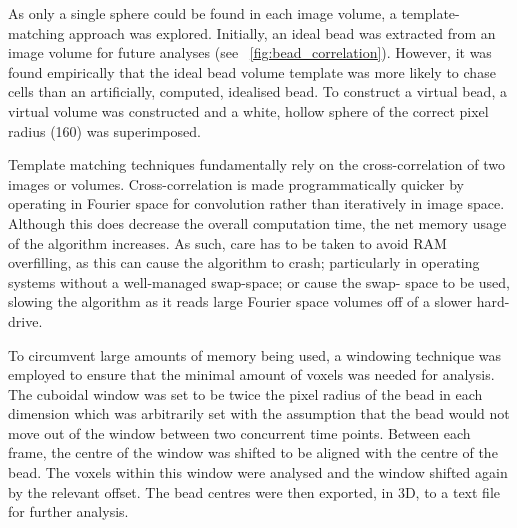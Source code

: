 As only a single sphere could be found in each image volume, a template-matching approach was explored.
Initially, an ideal bead was extracted from an image volume for future analyses (see \figurename~\ref{fig:bead_correlation}).
However, it was found empirically that the ideal bead volume template was more likely to chase cells than an artificially, computed, idealised bead.
To construct a virtual bead, a virtual volume was constructed and a white, hollow sphere of the correct pixel radius (\SI{160}{}) was superimposed.
%
%

Template matching techniques fundamentally rely on the cross-correlation of two images or volumes.
Cross-correlation is made programmatically quicker by operating in Fourier space for convolution rather than iteratively in image space.
Although this does decrease the overall computation time, the net memory usage of the algorithm increases.
As such, care has to be taken to avoid \gls{RAM} overfilling, as this can cause the algorithm to crash;
particularly in operating systems without a well-managed swap-space; or cause the swap- space to be used, slowing the algorithm as it reads large Fourier space volumes off of a slower hard-drive.


To circumvent large amounts of memory being used, a windowing technique	was employed to ensure that the minimal amount of voxels was needed for analysis.
The cuboidal window was set to be twice the pixel radius of the bead in each dimension which was arbitrarily set with the assumption that the bead would not move out of the window between two concurrent time points.
Between each frame, the centre of the window was shifted to be aligned with the centre of the bead.
The voxels within this window were analysed and the window shifted again by the relevant offset.
The bead centres were then exported, in 3D, to a text file for further analysis.

